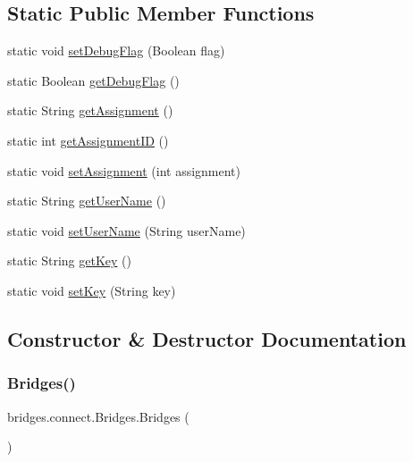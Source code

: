 \subsection*{Static Public Member Functions}
\begin{DoxyCompactItemize}
\item 
static void \mbox{\hyperlink{classbridges_1_1connect_1_1_bridges_a9295b15aa880aa976706ed4f3337fb3b}{set\+Debug\+Flag}} (Boolean flag)
\item 
static Boolean \mbox{\hyperlink{classbridges_1_1connect_1_1_bridges_a5c9fa0dd62084bfd916c8bdecee3f517}{get\+Debug\+Flag}} ()
\item 
static String \mbox{\hyperlink{classbridges_1_1connect_1_1_bridges_af049c06c532987eb616156fb16ea2f43}{get\+Assignment}} ()
\item 
static int \mbox{\hyperlink{classbridges_1_1connect_1_1_bridges_ac13ed456687540b57c138adb11735d95}{get\+Assignment\+ID}} ()
\item 
static void \mbox{\hyperlink{classbridges_1_1connect_1_1_bridges_ad56c9d138965c41947bb51fe056c1cc9}{set\+Assignment}} (int assignment)
\item 
static String \mbox{\hyperlink{classbridges_1_1connect_1_1_bridges_a75f047cda3100e0cfa88378293c12961}{get\+User\+Name}} ()
\item 
static void \mbox{\hyperlink{classbridges_1_1connect_1_1_bridges_af9b9a2ca03ba02c0c2be4716594678a6}{set\+User\+Name}} (String user\+Name)
\item 
static String \mbox{\hyperlink{classbridges_1_1connect_1_1_bridges_a426897d6e5449601bb4e20c32b8346f5}{get\+Key}} ()
\item 
static void \mbox{\hyperlink{classbridges_1_1connect_1_1_bridges_ab69e89ec7d2e674a8b8c4b0be0c63397}{set\+Key}} (String key)
\end{DoxyCompactItemize}


\subsection{Constructor \& Destructor Documentation}
\mbox{\label{classbridges_1_1connect_1_1_bridges_a42f0592841a829f93453506c78951b1f}} 
\subsubsection{\texorpdfstring{Bridges()}{Bridges()}\hspace{0.1cm}{\footnotesize\ttfamily [1/2]}}
{\footnotesize\ttfamily bridges.\+connect.\+Bridges.\+Bridges (\begin{DoxyParamCaption}{ }\end{DoxyParamCaption})}

